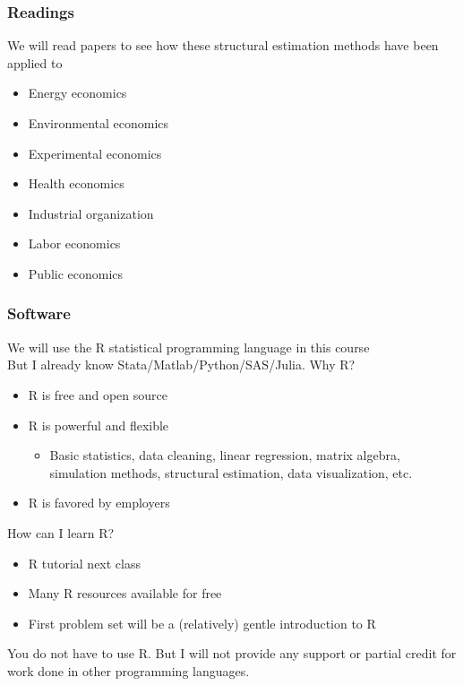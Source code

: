 \documentclass{beamer}\usepackage[]{graphicx}\usepackage[]{color}
\begin{document}
\begin{frame}\frametitle{Readings}
    We will read papers to see how these structural estimation methods have been applied to
    \begin{itemize}
        \item Energy economics
        \item Environmental economics
        \item Experimental economics
        \item Health economics
        \item Industrial organization
        \item Labor economics
        \item Public economics
    \end{itemize}
\end{frame}

\begin{frame}\frametitle{Software}
    We will use the R statistical programming language in this course \\
    \vspace{1.5ex}
    But I already know Stata/Matlab/Python/SAS/Julia. Why R?
    \begin{itemize}
        \item R is free and open source
        \item R is powerful and flexible
        \begin{itemize}
            \item Basic statistics, data cleaning, linear regression, matrix algebra, simulation methods, structural estimation, data visualization, etc.
        \end{itemize}
        \item R is favored by employers
    \end{itemize}
    \vspace{1.5ex}
    How can I learn R?
    \begin{itemize}
        \item R tutorial next class
        \item Many R resources available for free
        \item First problem set will be a (relatively) gentle introduction to R
    \end{itemize}
    \vspace{1.5ex}
    You do not have to use R. But I will not provide any support or partial credit for work done in other programming languages.
\end{frame}
\end{document}
